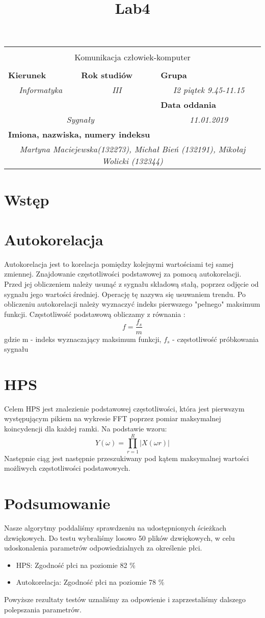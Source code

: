\documentclass[polish,a4paper]{article}
\title{Lab4}
\newcommand{\PRzFieldDsc}[1]{\sffamily\bfseries\scriptsize #1}
\newcommand{\PRzFieldCnt}[1]{\textit{#1}}
\newcommand{\PRzHeading}[8]{
\begin{center}
\begin{tabular}{ p{0.32\textwidth} p{0.15\textwidth} p{0.15\textwidth} p{0.12\textwidth} p{0.12\textwidth} }

  &   &   &   &   \\
\hline
\multicolumn{5}{|c|}{}\\[-1ex]
\multicolumn{5}{|c|}{{\LARGE #1}}\\
\multicolumn{5}{|c|}{}\\[-1ex]

\hline
\multicolumn{2}{|l|}{\PRzFieldDsc{Kierunek}}		& \multicolumn{1}{|l|}{\PRzFieldDsc{Rok studiów}}	& \multicolumn{2}{|l|}{\PRzFieldDsc{Grupa}} \\
\multicolumn{2}{|c|}{\PRzFieldCnt{#2}}				& \multicolumn{1}{|c|}{\PRzFieldCnt{#4}}		& \multicolumn{2}{|c|}{\PRzFieldCnt{#5}} \\

\hline
\multicolumn{3}{|l|}{\PRzFieldDsc{}}		& \multicolumn{2}{|l|}{\PRzFieldDsc{Data oddania}} \\
\multicolumn{3}{|c|}{\PRzFieldCnt{#6}}				& \multicolumn{2}{|c|}{\PRzFieldCnt{#7}} \\

\hline
\multicolumn{5}{|l|}{\PRzFieldDsc{Imiona, nazwiska, numery indeksu}}\\
\multicolumn{5}{|c|}{\PRzFieldCnt{#8}}\\



\hline
\end{tabular}
\end{center}
}
\begin{document}
\PRzHeading{Komunikacja człowiek-komputer}{Informatyka}{--}{III}{I2 piątek 9.45-11.15}{Sygnały}{11.01.2019}{Martyna Maciejewska(132273), Michał Bień (132191), Mikołaj Wolicki (132344)}{}


\section{Wstęp}


\section{Autokorelacja}
Autokorelacja jest to korelacja pomiędzy kolejnymi wartościami tej samej zmiennej.
\newline
Znajdowanie częstotliwości podstawowej za pomocą autokorelacji. Przed jej obliczeniem należy usunąć z sygnału składową stałą, poprzez odjęcie od sygnału jego wartości średniej. Operację tę nazywa się usuwaniem trendu. Po obliczeniu autokorelacji należy wyznaczyć indeks pierwszego "pełnego" maksimum funkcji. Częstotliwość podstawową obliczamy z równania :
$$f = \frac{f_{s}}{m}$$
gdzie m - indeks wyznaczający maksimum funkcji, 
\newline
$f_{s}$ - częstotliwość próbkowania sygnału
\section{HPS}
Celem HPS jest znalezienie podstawowej częstotliwości, która jest pierwszym
występującym pikiem na wykresie FFT poprzez pomiar maksymalnej koincydencji dla każdej ramki. Na podstawie wzoru:
\[Y(\omega )=\prod_{r=1}^{R}\left | X(\omega r) \right |\]
\newline
Następnie ciąg jest następnie przeszukiwany pod kątem maksymalnej wartości możliwych częstotliwości podstawowych.


\section{Podsumowanie}
Nasze algorytmy poddaliśmy sprawdzeniu na udostępnionych ścieżkach dzwiękowych. Do testu wybraliśmy losowo 50 plików dzwiękowych, w celu udoskonalenia parametrów odpowiedzialnych za określenie płci.

\begin{itemize}
  \item HPS:  Zgodność płci na poziomie 82 \%
  \item Autokorelacja: Zgodność płci na poziomie 78 \%
\end{itemize}

Powyższe rezultaty testów uznaliśmy za odpowienie i zaprzestaliśmy dalszego polepszania parametrów.
\end{document}
